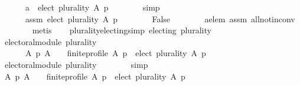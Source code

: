 \begin{isabellebody}
\ \ \ \ \ \ {\isachardoublequoteopen}a\ {\isasymin}\ elect\ plurality\ A\ p{\isachardoublequoteclose}\isanewline
\ \ \ \ \ \ \isamarkupfalse%
\ simp\isanewline
\ \ \ \ \isamarkupfalse%
\isanewline
\ \ \ \ \ \ assm{}{\isacharcolon}{\kern0pt}\ {\isachardoublequoteopen}elect\ plurality\ A\ p\ {\isacharequal}{\kern0pt}\ {\isacharbraceleft}{\kern0pt}{\isacharbraceright}{\kern0pt}{\isachardoublequoteclose}\isanewline
\ \ \ \ \isamarkupfalse%
\ {\isachardoublequoteopen}False{\isachardoublequoteclose}\isanewline
\ \ \ \ \ \ \isamarkupfalse%
\ a{\isacharunderscore}{\kern0pt}elem\ assm{}\ all{\isacharunderscore}{\kern0pt}not{\isacharunderscore}{\kern0pt}in{\isacharunderscore}{\kern0pt}conv\isanewline
\ \ \ \ \ \ \isamarkupfalse%
\ metis\isanewline
\ \ \isamarkupfalse%
\isanewline
{}\isamarkupfalse%
%
\endisatagproof
{\isafoldproof}%
%
\isadelimproof
\isanewline
%
\endisadelimproof
\isanewline
\isanewline
{}\isamarkupfalse%
\ plurality{\isacharunderscore}{\kern0pt}electing{\isacharbrackleft}{\kern0pt}simp{\isacharbrackright}{\kern0pt}{\isacharcolon}{\kern0pt}\ {\isachardoublequoteopen}electing\ plurality{\isachardoublequoteclose}\isanewline
%
\isadelimproof
%
\endisadelimproof
%
\isatagproof
{}\isamarkupfalse%
\ {\isacharminus}{\kern0pt}\isanewline
\ \ \isamarkupfalse%
\ {\isachardoublequoteopen}electoral{\isacharunderscore}{\kern0pt}module\ plurality\ {\isasymand}\isanewline
\ \ \ \ \ \ {\isacharparenleft}{\kern0pt}{\isasymforall}A\ p{\isachardot}{\kern0pt}\ {\isacharparenleft}{\kern0pt}A\ {\isasymnoteq}\ {\isacharbraceleft}{\kern0pt}{\isacharbraceright}{\kern0pt}\ {\isasymand}\ finite{\isacharunderscore}{\kern0pt}profile\ A\ p{\isacharparenright}{\kern0pt}\ {\isasymlongrightarrow}\ elect\ plurality\ A\ p\ {\isasymnoteq}\ {\isacharbraceleft}{\kern0pt}{\isacharbraceright}{\kern0pt}{\isacharparenright}{\kern0pt}{\isachardoublequoteclose}\isanewline
\ \ \isamarkupfalse%
\isanewline
\ \ \ \ \isamarkupfalse%
\ {\isachardoublequoteopen}electoral{\isacharunderscore}{\kern0pt}module\ plurality{\isachardoublequoteclose}\isanewline
\ \ \ \ \ \ \isamarkupfalse%
\ simp\isanewline
\ \ \isamarkupfalse%
\isanewline
\ \ \ \ \isamarkupfalse%
\ {\isachardoublequoteopen}{\isacharparenleft}{\kern0pt}{\isasymforall}A\ p{\isachardot}{\kern0pt}\ {\isacharparenleft}{\kern0pt}A\ {\isasymnoteq}\ {\isacharbraceleft}{\kern0pt}{\isacharbraceright}{\kern0pt}\ {\isasymand}\ finite{\isacharunderscore}{\kern0pt}profile\ A\ p{\isacharparenright}{\kern0pt}\ {\isasymlongrightarrow}\ elect\ plurality\ A\ p\ {\isasymnoteq}\ {\isacharbraceleft}{\kern0pt}{\isacharbraceright}{\kern0pt}{\isacharparenright}{\kern0pt}{\isachardoublequoteclose}\isanewline

\end{isabellebody}
